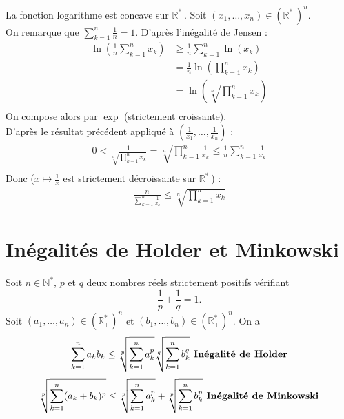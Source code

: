 \documentclass[../main.tex]{subfiles}
\begin{document}
\noindent La fonction logarithme est concave sur $\mathbb{R}_+^*$. Soit $(x_1, \ldots, x_n) \in (\mathbb{R}_+^*)^n$. \\
On remarque que $\sum\limits_{k=1}^{n} \frac{1}{n} = 1$. D'après l'inégalité de Jensen :
\begin{align*}
    \ln \left( \frac{1}{n} \sum_{k=1}^{n} x_k \right) &\geq \frac{1}{n} \sum_{k=1}^{n} \ln(x_k) \\
    &= \frac{1}{n} \ln \left( \prod_{k=1}^{n} x_k \right) \\
    &= \ln \left( \sqrt[n]{\prod_{k=1}^{n} x_k} \right) \\
\end{align*} 
On compose alors par $\exp$ (strictement croissante). \\
D'après le résultat précédent appliqué à $\left( \frac{1}{x_1}, \ldots, \frac{1}{x_n} \right)$ : 
\begin{align*}
    0 < \frac{1}{\sqrt[n]{\prod\limits_{k=1}^{n} x_k}} = \sqrt[n]{\prod_{k=1}^{n} \frac{1}{x_k}} \leq \frac{1}{n} \sum_{k=1}^{n} \frac{1}{x_k} \\
\end{align*}
Donc ($x\mapsto \frac{1}{x}$ est strictement décroissante sur $\mathbb{R}_+^*$) :
\begin{align*}
    \frac{n}{\sum\limits_{k=1}^{n} \frac{1}{x_k}} \leq \sqrt[n]{\prod_{k=1}^{n} x_k}
\end{align*}

\section{Inégalités de Holder et Minkowski}
\begin{tcolorbox}[title=Théorème 19.26, title filled=false, colframe=orange, colback=orange!10!white]
    Soit $n \in \mathbb{N}^*$, $p$ et $q$ deux nombres réels strictement positifs vérifiant
    $$\frac{1}{p} + \frac{1}{q} = 1.$$
    Soit $(a_1, \ldots, a_n) \in (\mathbb{R}_+^*)^n$ et $(b_1, \ldots, b_n) \in (\mathbb{R}_+^*)^n$. On a
    $$\sum_{k=1}^{n} a_k b_k \leq \sqrt[p]{\sum_{k=1}^{n} a_k^p} \sqrt[q]{\sum_{k=1}^{n} b_k^q} \text{\textbf{ Inégalité de Holder}}$$
    $$\sqrt[p]{\sum_{k=1}^{n} (a_k + b_k)^p} \leq \sqrt[p]{\sum_{k=1}^{n} a_k^p} + \sqrt[p]{\sum_{k=1}^{n} b_k^p} \text{\textbf{ Inégalité de Minkowski}}$$
\end{tcolorbox}
\end{document}
